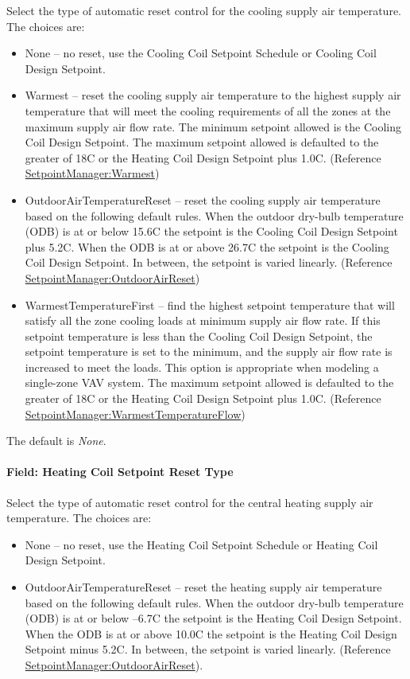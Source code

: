 Select the type of automatic reset control for the cooling supply air temperature. The choices are:

\begin{itemize}
\item
  None -- no reset, use the Cooling Coil Setpoint Schedule or Cooling Coil Design Setpoint.
\item
  Warmest -- reset the cooling supply air temperature to the highest supply air temperature that will meet the cooling requirements of all the zones at the maximum supply air flow rate. The minimum setpoint allowed is the Cooling Coil Design Setpoint. The maximum setpoint allowed is defaulted to the greater of 18C or the Heating Coil Design Setpoint plus 1.0C. (Reference \hyperref[setpointmanagerwarmest]{SetpointManager:Warmest})
\item
  OutdoorAirTemperatureReset -- reset the cooling supply air temperature based on the following default rules. When the outdoor dry-bulb temperature (ODB) is at or below 15.6C the setpoint is the Cooling Coil Design Setpoint plus 5.2C. When the ODB is at or above 26.7C the setpoint is the Cooling Coil Design Setpoint. In between, the setpoint is varied linearly. (Reference \hyperref[setpointmanageroutdoorairreset]{SetpointManager:OutdoorAirReset})
\item
  WarmestTemperatureFirst -- find the highest setpoint temperature that will satisfy all the zone cooling loads at minimum supply air flow rate. If this setpoint temperature is less than the Cooling Coil Design Setpoint, the setpoint temperature is set to the minimum, and the supply air flow rate is increased to meet the loads. This option is appropriate when modeling a single-zone VAV system. The maximum setpoint allowed is defaulted to the greater of 18C or the Heating Coil Design Setpoint plus 1.0C. (Reference \hyperref[setpointmanagerwarmesttemperatureflow]{SetpointManager:WarmestTemperatureFlow})
\end{itemize}

The default is \emph{None}.

\paragraph{Field: Heating Coil Setpoint Reset Type}\label{field-heating-coil-setpoint-reset-type}

Select the type of automatic reset control for the central heating supply air temperature. The choices are:

\begin{itemize}
\item
  None -- no reset, use the Heating Coil Setpoint Schedule or Heating Coil Design Setpoint.
\item
  OutdoorAirTemperatureReset -- reset the heating supply air temperature based on the following default rules. When the outdoor dry-bulb temperature (ODB) is at or below --6.7C the setpoint is the Heating Coil Design Setpoint. When the ODB is at or above 10.0C the setpoint is the Heating Coil Design Setpoint minus 5.2C. In between, the setpoint is varied linearly. (Reference \hyperref[setpointmanageroutdoorairreset]{SetpointManager:OutdoorAirReset}).
\end{itemize}

